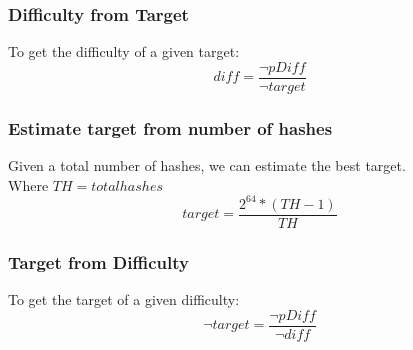 \documentclass[12pt]{article}
\begin{document}
    \subsubsection{Difficulty from Target}
    To get the difficulty of a given target:
    \large{\[
    diff = \frac{\neg pDiff}{\neg target}
    \]}

    \subsubsection{Estimate target from number of hashes}
    Given a total number of hashes, we can estimate the best target.\\ Where $TH = totalhashes$
     \large{\[
    target=\frac{2^{64}*(TH-1)}{TH}
    \]}


    \subsubsection{Target from Difficulty}
    To get the target of a given difficulty:
    \large{\[
    \neg target = \frac{\neg pDiff}{\neg diff}
    \]}
\end{document}
